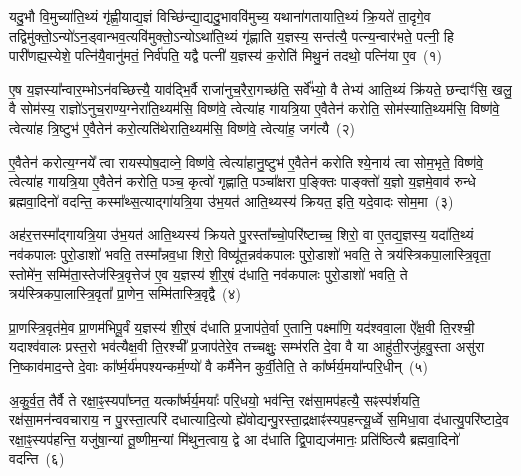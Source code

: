 \setcounter{anuvakam}{0}
यदु॒भौ वि॒मुच्या॑ति॒थ्यं गृ॑ह्णी॒याद्य॒ज्ञं विच्छि॑न्द्या॒द्यदु॒भाववि॑मुच्य॒ यथाना॑गतायाति॒थ्यं क्रि॒यते॑ ता॒दृगे॒व तद्विमु॑क्तो॒\-ऽन्यो॑\-ऽन॒ड्वान्भव॒त्यवि॑मुक्तो॒\-ऽन्यो\-ऽथा॑ति॒थ्यं गृ॑ह्णाति य॒ज्ञस्य॒ सन्त॑त्यै॒ पत्न्य॒न्वार॑भते॒ पत्नी॒ हि पारी॑णह्य॒स्येशे॒ पत्नि॑यै॒वानु॑मतं॒ निर्व॑पति॒ यद्वै पत्नी॑ य॒ज्ञस्य॑ क॒रोति॑ मिथु॒नं तदथो॒ पत्नि॑या ए॒व~(१)\ip

ए॒ष य॒ज्ञस्या᳚न्वार॒म्भो\-ऽन॑वच्छित्त्यै॒ याव॑द्भि॒र्वै राजा॑नुच॒रैरा॒गच्छ॑ति॒ सर्वे᳚भ्यो॒ वै तेभ्य॑ आति॒थ्यं क्रि॑यते॒ छन्दाꣳ॑सि॒ खलु॒ वै सोम॑स्य॒ राज्ञो॑\-ऽनुच॒राण्य॒ग्नेरा॑ति॒थ्यम॑सि॒ विष्ण॑वे॒ त्वेत्या॑ह गायत्रि॒या ए॒वैतेन॑ करोति॒ सोम॑स्याति॒थ्यम॑सि॒ विष्ण॑वे॒ त्वेत्या॑ह त्रि॒ष्टुभ॑ ए॒वैतेन॑ करो॒त्यति॑थेराति॒थ्यम॑सि॒ विष्ण॑वे॒ त्वेत्या॑ह॒ जग॑त्यै~(२)\ip

ए॒वैतेन॑ करोत्य॒ग्नये᳚ त्वा रायस्पोष॒दाव्ने॒ विष्ण॑वे॒ त्वेत्या॑हानु॒ष्टुभ॑ ए॒वैतेन॑ करोति श्ये॒नाय॑ त्वा सोम॒भृते॒ विष्ण॑वे॒ त्वेत्या॑ह गायत्रि॒या ए॒वैतेन॑ करोति॒ पञ्च॒ कृत्वो॑ गृह्णाति॒ पञ्चा᳚क्षरा प॒ङ्क्तिः पाङ्क्तो॑ य॒ज्ञो य॒ज्ञमे॒वाव॑ रुन्धे ब्रह्मवा॒दिनो॑ वदन्ति॒ कस्मा᳚थ्स॒त्याद्गा॑यत्रि॒या उ॑भ॒यत॑ आति॒थ्यस्य॑ क्रियत॒ इति॒ यदे॒वादः सोम॒मा~(३)\ip

अह॑र॒त्तस्मा᳚द्\-गायत्रि॒या उ॑भ॒यत॑ आति॒थ्यस्य॑ क्रियते पु॒रस्ता᳚च्चो॒परि॑ष्टाच्च॒ शिरो॒ वा ए॒तद्य॒ज्ञस्य॒ यदा॑ति॒थ्यं नव॑कपालः पुरो॒डाशो॑ भवति॒ तस्मा᳚न्नव॒धा शिरो॒ विष्यू॑त॒न्नव॑कपालः पुरो॒डाशो॑ भवति॒ ते त्रय॑स्त्रिकपा॒लास्त्रि॒वृता॒ स्तोमे॑न॒ सम्मि॑ता॒स्तेज॑स्त्रि॒वृत्तेज॑ ए॒व य॒ज्ञस्य॑ शी॒र्॒\mbox{}षं द॑धाति॒ नव॑कपालः पुरो॒डाशो॑ भवति॒ ते त्रय॑स्त्रिकपा॒लास्त्रि॒वृता᳚ प्रा॒णेन॒ सम्मि॑तास्त्रि॒वृद्वै~(४)\ip

प्रा॒णस्त्रि॒वृत॑मे॒व प्रा॒णम॑भिपू॒र्वं य॒ज्ञस्य॑ शी॒र्॒\mbox{}षं द॑धाति प्र॒जा\-प॑ते॒र्वा ए॒तानि॒ पक्ष्मा॑णि॒ यद॑श्ववा॒ला ऐ᳚क्ष॒वी ति॒रश्ची॒ यदाश्व॑वालः प्रस्त॒रो भव॑त्यैक्ष॒वी ति॒रश्ची᳚ प्र॒जा\-प॑तेरे॒व तच्चक्षुः॒ सम्भ॑रति दे॒वा वै या आहु॑ती॒रजु॑हवु॒स्ता असु॑रा नि॒ष्काव॑माद॒न्ते दे॒वाः का᳚र्\mbox{}ष्म॒र्य॑मपश्यन्कर्म॒ण्यो॑ वै कर्मै॑नेन कुर्वी॒तेति॒ ते का᳚र्ष्मर्य॒मया᳚न्परि॒धीन्~(५)\ip

अ॒कु॒र्व॒त॒ तैर्वै ते रक्षा॒ꣴ॒स्यपा᳚घ्नत॒ यत्का᳚र्ष्मर्य॒मयाः᳚ परि॒धयो॒ भव॑न्ति॒ रक्ष॑सा॒मप॑हत्यै॒ सꣴस्प॑र्\mbox{}शयति॒ रक्ष॑सा॒मन॑न्ववचाराय॒ न पु॒रस्ता॒त्परि॑ दधात्यादि॒त्यो ह्ये॑वोद्यन्\-पु॒रस्ता॒द्\-रक्षाꣴ॑स्यप॒हन्त्यू॒र्ध्वे स॒मिधा॒वा द॑धात्यु॒परि॑ष्टादे॒व रक्षा॒ꣴ॒स्यप॑हन्ति॒ यजु॑षा॒न्यां तू॒ष्णीम॒न्यां मि॑थुन॒त्वाय॒ द्वे आ द॑धाति द्वि॒पाद्यज॑मानः॒ प्रति॑ष्ठित्यै ब्रह्मवा॒दिनो॑ वदन्ति~(६)\ip

